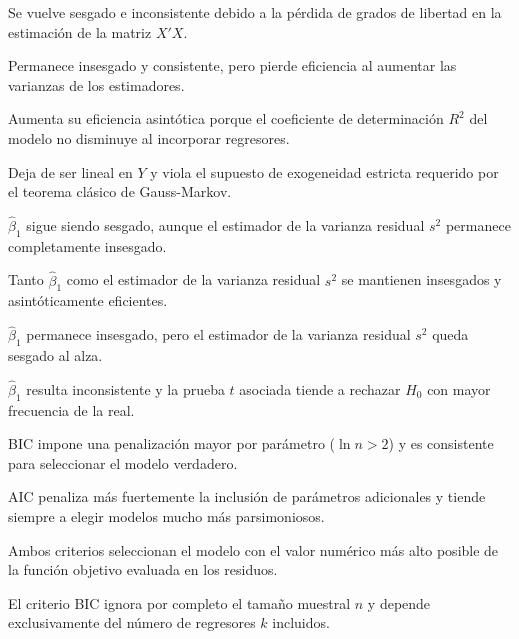 \begin{opts}
    \item Se vuelve sesgado e inconsistente debido a la pérdida de grados de libertad en la estimación de la matriz $X'X$.
    \item Permanece insesgado y consistente, pero pierde eficiencia al aumentar las varianzas de los estimadores.
    \item Aumenta su eficiencia asintótica porque el coeficiente de determinación $R^2$ del modelo no disminuye al incorporar regresores.
    \item Deja de ser lineal en $Y$ y viola el supuesto de exogeneidad estricta requerido por el teorema clásico de Gauss-Markov.
\end{opts}

\begin{opts}
    \item $\hat{\beta}_1$ sigue siendo sesgado, aunque el estimador de la varianza residual $s^2$ permanece completamente insesgado.
    \item Tanto $\hat{\beta}_1$ como el estimador de la varianza residual $s^2$ se mantienen insesgados y asintóticamente eficientes.
    \item $\hat{\beta}_1$ permanece insesgado, pero el estimador de la varianza residual $s^2$ queda sesgado al alza.
    \item $\hat{\beta}_1$ resulta inconsistente y la prueba $t$ asociada tiende a rechazar $H_0$ con mayor frecuencia de la real.
\end{opts}

\begin{opts}
    \item BIC impone una penalización mayor por parámetro ($\ln n > 2$) y es consistente para seleccionar el modelo verdadero.
    \item AIC penaliza más fuertemente la inclusión de parámetros adicionales y tiende siempre a elegir modelos mucho más parsimoniosos.
    \item Ambos criterios seleccionan el modelo con el valor numérico más alto posible de la función objetivo evaluada en los residuos.
    \item El criterio BIC ignora por completo el tamaño muestral $n$ y depende exclusivamente del número de regresores $k$ incluidos.
\end{opts}

